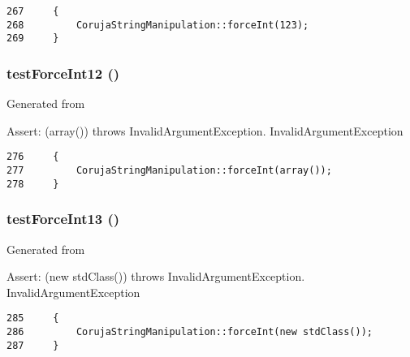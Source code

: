 \begin{Code}\begin{verbatim}267     {
268         CorujaStringManipulation::forceInt(123);
269     }
\end{verbatim}
\end{Code}


\hypertarget{class_coruja_string_manipulation_test_c00aa102030546f5d06681b1ba8fa6d0}{
\subsubsection[{testForceInt12}]{\setlength{\rightskip}{0pt plus 5cm}testForceInt12 ()}}
\label{class_coruja_string_manipulation_test_c00aa102030546f5d06681b1ba8fa6d0}


Generated from \begin{Desc}
\item[Assert:](array()) throws InvalidArgumentException.  InvalidArgumentException \end{Desc}


\begin{Code}\begin{verbatim}276     {
277         CorujaStringManipulation::forceInt(array());
278     }
\end{verbatim}
\end{Code}


\hypertarget{class_coruja_string_manipulation_test_5b51f50b312633754e5ee53c3c86efb3}{
\subsubsection[{testForceInt13}]{\setlength{\rightskip}{0pt plus 5cm}testForceInt13 ()}}
\label{class_coruja_string_manipulation_test_5b51f50b312633754e5ee53c3c86efb3}


Generated from \begin{Desc}
\item[Assert:](new stdClass()) throws InvalidArgumentException.  InvalidArgumentException \end{Desc}


\begin{Code}\begin{verbatim}285     {
286         CorujaStringManipulation::forceInt(new stdClass());
287     }
\end{verbatim}
\end{Code}


